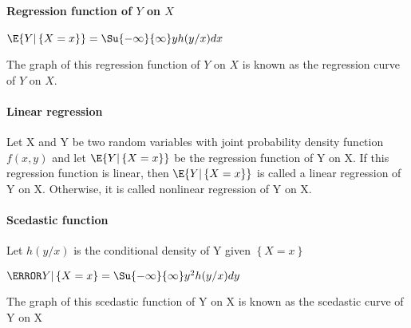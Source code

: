 \paragraph{Regression function of $Y$ on $X$}
\begin{center}
	$\E{Y|\left\{ X=x \right\}}=\Su{ {-\infty}}{\infty}yh(y/x)dx$
\end{center}
The graph of this regression function of $Y$ on $X$ is known as the 
regression curve of $Y$ on $X$.
\paragraph{Linear regression}
Let X and Y be two random variables with joint probability density function
$f(x, y)$ and let $\E{Y |\left\{ X = x \right\}}$ be the regression function of Y
on X. If this regression function is linear, then $\E{Y |\left\{ X = x \right\}}$ is called a linear
regression of Y on X. Otherwise, it is called nonlinear regression of Y on X.
\paragraph{Scedastic function}
Let $h(y/x)$ is the conditional density of Y given $\left\{ X=x \right\}$
\begin{center}
	$\V{Y|\left\{ X=x \right\}}=\Su{ {-\infty}}{\infty}y^{2}h(y/x)dy$
\end{center}
The graph of this scedastic function of Y on X is known as the scedastic
curve of Y on X
